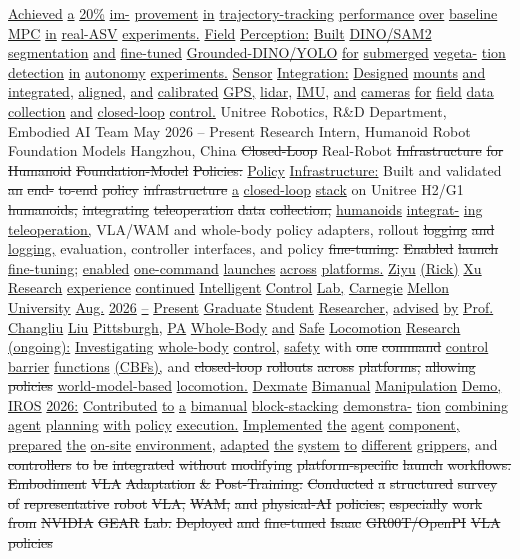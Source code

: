 \documentclass[10pt,letterpaper]{article}
\newcommand{\del}[1]{{\color{red}\sout{#1}}}
\newcommand{\add}[1]{{\color{blue}\uline{#1}}}
\begin{document}
\add{Achieved} \add{a} \add{20\%} \add{im-} \add{provement} \add{in} \add{trajectory-tracking} \add{performance} \add{over} \add{baseline} \add{MPC} \add{in} \add{real-ASV} \add{experiments.} \add{} \add{Field} \add{Perception:} \add{Built} \add{DINO/SAM2} \add{segmentation} \add{and} \add{fine-tuned} \add{Grounded-DINO/YOLO} \add{for} \add{submerged} \add{vegeta-} \add{tion} \add{detection} \add{in} \add{autonomy} \add{experiments.} \add{} \add{Sensor} \add{Integration:} \add{Designed} \add{mounts} \add{and} \add{integrated,} \add{aligned,} \add{and} \add{calibrated} \add{GPS,} \add{lidar,} \add{IMU,} \add{and} \add{cameras} \add{for} \add{field} \add{data} \add{collection} \add{and} \add{closed-loop} \add{control.} Unitree Robotics, R\&D Department, Embodied AI Team May 2026 -- Present Research Intern, Humanoid Robot Foundation Models Hangzhou, China  \del{Closed-Loop} Real-Robot \del{Infrastructure} \del{for} \del{Humanoid} \del{Foundation-Model} \del{Policies:} \add{Policy} \add{Infrastructure:} Built and validated \del{an} \del{end-} \del{to-end} \del{policy} \del{infrastructure} \add{a} \add{closed-loop} \add{stack} on Unitree H2/G1 \del{humanoids,} \del{integrating} \del{teleoperation} \del{data} \del{collection,} \add{humanoids} \add{integrat-} \add{ing} \add{teleoperation,} VLA/WAM and whole-body policy adapters, rollout \del{logging} \del{and} \add{logging,} evaluation, controller interfaces, and policy \del{fine-tuning.} \del{Enabled} \del{launch} \add{fine-tuning;} \add{enabled} \add{one-command} \add{launches} \add{across} \add{platforms.} \add{Ziyu} \add{(Rick)} \add{Xu} \add{Research} \add{experience} \add{continued} \add{Intelligent} \add{Control} \add{Lab,} \add{Carnegie} \add{Mellon} \add{University} \add{Aug.} \add{2026} \add{--} \add{Present} \add{Graduate} \add{Student} \add{Researcher,} \add{advised} \add{by} \add{Prof.} \add{Changliu} \add{Liu} \add{Pittsburgh,} \add{PA} \add{} \add{Whole-Body} \add{and} \add{Safe} \add{Locomotion} \add{Research} \add{(ongoing):} \add{Investigating} \add{whole-body} \add{control,} \add{safety} with \del{one} \del{command} \add{control} \add{barrier} \add{functions} \add{(CBFs),} and \del{closed-loop} \del{rollouts} \del{across} \del{platforms,} \del{allowing} \del{policies} \add{world-model-based} \add{locomotion.} \add{} \add{Dexmate} \add{Bimanual} \add{Manipulation} \add{Demo,} \add{IROS} \add{2026:} \add{Contributed} \add{to} \add{a} \add{bimanual} \add{block-stacking} \add{demonstra-} \add{tion} \add{combining} \add{agent} \add{planning} \add{with} \add{policy} \add{execution.} \add{Implemented} \add{the} \add{agent} \add{component,} \add{prepared} \add{the} \add{on-site} \add{environment,} \add{adapted} \add{the} \add{system} \add{to} \add{different} \add{grippers,} and \del{controllers} \del{to} \del{be} \del{integrated} \del{without} \del{modifying} \del{platform-specific} \del{launch} \del{workflows.} \del{} \del{Embodiment} \del{VLA} \del{Adaptation} \del{\&} \del{Post-Training:} \del{Conducted} \del{a} \del{structured} \del{survey} \del{of} \del{representative} \del{robot} \del{VLA,} \del{WAM,} \del{and} \del{physical-AI} \del{policies,} \del{especially} \del{work} \del{from} \del{NVIDIA} \del{GEAR} \del{Lab.} \del{Deployed} \del{and} \del{fine-tuned} \del{Isaac} \del{GR00T/OpenPI} \del{VLA} \del{policies} 
\end{document}
